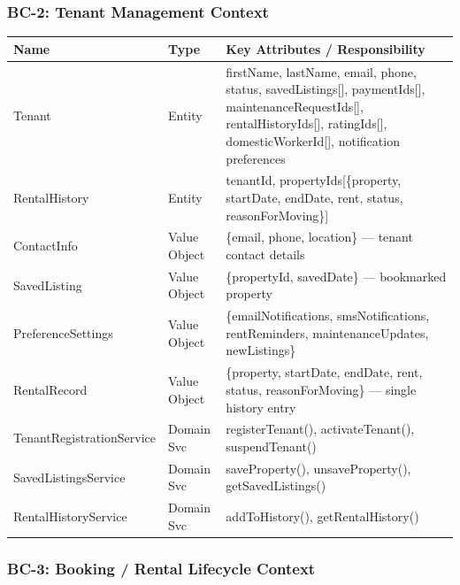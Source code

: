 \documentclass[12pt,a4paper]{article}
\begin{document}
\subsubsection{BC-2: Tenant Management Context}

\begin{center}
\begin{tabular}{@{}p{3.5cm}p{2cm}p{8.5cm}@{}}
\toprule
\textbf{Name} & \textbf{Type} & \textbf{Key Attributes / Responsibility} \\
\midrule
Tenant & Entity & firstName, lastName, email, phone, status, savedListings[], paymentIds[], maintenanceRequestIds[], rentalHistoryIds[], ratingIds[], domesticWorkerId[], notification preferences \\
RentalHistory & Entity & tenantId, propertyIds[\{property, startDate, endDate, rent, status, reasonForMoving\}] \\
ContactInfo & Value Object & \{email, phone, location\} — tenant contact details \\
SavedListing & Value Object & \{propertyId, savedDate\} — bookmarked property \\
PreferenceSettings & Value Object & \{emailNotifications, smsNotifications, rentReminders, maintenanceUpdates, newListings\} \\
RentalRecord & Value Object & \{property, startDate, endDate, rent, status, reasonForMoving\} — single history entry \\
TenantRegistrationService & Domain Svc & registerTenant(), activateTenant(), suspendTenant() \\
SavedListingsService & Domain Svc & saveProperty(), unsaveProperty(), getSavedListings() \\
RentalHistoryService & Domain Svc & addToHistory(), getRentalHistory() \\
\bottomrule
\end{tabular}
\end{center}

\subsubsection{BC-3: Booking / Rental Lifecycle Context}
\end{document}
